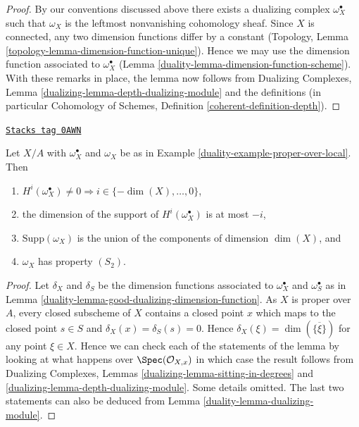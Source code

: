 \begin{proof}

By our conventions discussed above there exists a dualizing complex
$\omega_X^\bullet$ such that $\omega_X$ is the leftmost nonvanishing
cohomology sheaf. Since $X$ is connected, any two dimension functions
differ by a constant
(Topology, Lemma \ref{topology-lemma-dimension-function-unique}).
Hence we may use the
dimension function associated to $\omega_X^\bullet$
(Lemma \ref{duality-lemma-dimension-function-scheme}).
With these remarks in place, the lemma now
follows from Dualizing Complexes, Lemma
\ref{dualizing-lemma-depth-dualizing-module}
and the definitions (in particular
Cohomology of Schemes, Definition \ref{coherent-definition-depth}).
\end{proof}

\begin{lemma}
\label{duality-lemma-vanishing-good-dualizing}
\href{https://stacks.math.columbia.edu/tag/0AWN}{\texttt{Stacks tag 0AWN}}

Let $X/A$ with $\omega_X^\bullet$ and $\omega_X$ be as in
Example \ref{duality-example-proper-over-local}. Then
\begin{enumerate}
\item $H^i(\omega_X^\bullet) \not = 0 \Rightarrow
i \in \{-\dim(X), \ldots, 0\}$,
\item the dimension of the support of $H^i(\omega_X^\bullet)$ is at most $-i$,
\item $\text{Supp}(\omega_X)$ is the union of
the components of dimension $\dim(X)$, and
\item $\omega_X$ has property $(S_2)$.
\end{enumerate}
\end{lemma}

\begin{proof}

Let $\delta_X$ and $\delta_S$ be the dimension functions associated to
$\omega_X^\bullet$ and $\omega_S^\bullet$ as in
Lemma \ref{duality-lemma-good-dualizing-dimension-function}.
As $X$ is proper over $A$, every closed subscheme of $X$ contains
a closed point $x$ which maps to the closed point $s \in S$
and $\delta_X(x) = \delta_S(s) = 0$. Hence
$\delta_X(\xi) = \dim(\overline{\{\xi\}})$ for any point
$\xi \in X$. Hence we can check each of
the statements of the lemma by looking at what happens over
$\Spec(\mathcal{O}_{X, x})$ in which case the result follows
from Dualizing Complexes, Lemmas \ref{dualizing-lemma-sitting-in-degrees} and
\ref{dualizing-lemma-depth-dualizing-module}.
Some details omitted.
The last two statements can also be deduced from
Lemma \ref{duality-lemma-dualizing-module}.
\end{proof}

